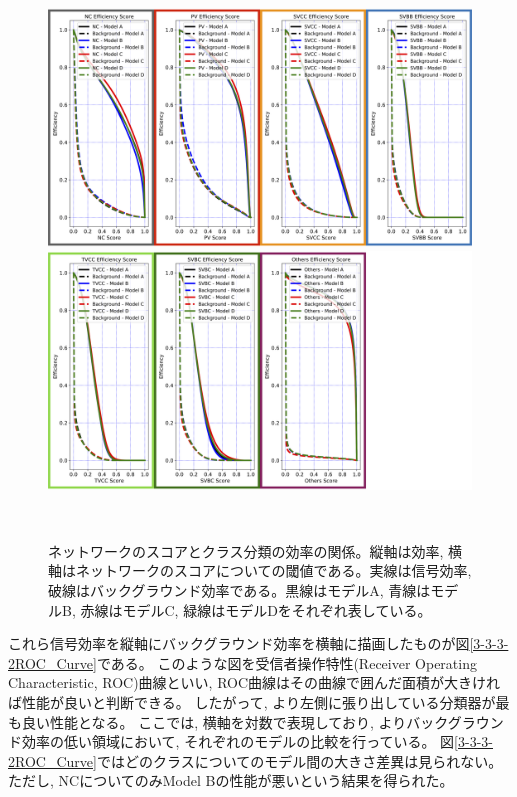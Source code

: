\begin{figure}[htbp]
 \centering
   \begin{minipage}{1.0\textwidth}
    \centering
    \includegraphics[width=1.0\textwidth, clip]{Figure/3Networks/3-3-3-2Efficiency_Curve_1.png}
   \end{minipage}

   \begin{minipage}{1.0\textwidth}
   \centering
    \includegraphics[width=1.0\textwidth, clip]{Figure/3Networks/3-3-3-2Efficiency_Curve_2.png}
   \end{minipage}
  \caption[ネットワークのスコアとクラス分類の効率の関係]{ネットワークのスコアとクラス分類の効率の関係。縦軸は効率, 横軸はネットワークのスコアについての閾値である。実線は信号効率, 破線はバックグラウンド効率である。黒線はモデルA, 青線はモデルB, 赤線はモデルC, 緑線はモデルDをそれぞれ表している。}
  \label{3-3-3-2Efficiency_Curve}
\end{figure}

これら信号効率を縦軸にバックグラウンド効率を横軸に描画したものが図\ref{3-3-3-2ROC_Curve}である。
このような図を受信者操作特性(Receiver Operating Characteristic, ROC)曲線といい, ROC曲線はその曲線で囲んだ面積が大きければ性能が良いと判断できる。
したがって, より左側に張り出している分類器が最も良い性能となる。
ここでは, 横軸を対数で表現しており, よりバックグラウンド効率の低い領域において, それぞれのモデルの比較を行っている。
図\ref{3-3-3-2ROC_Curve}ではどのクラスについてのモデル間の大きさ差異は見られない。
ただし, NCについてのみModel Bの性能が悪いという結果を得られた。

